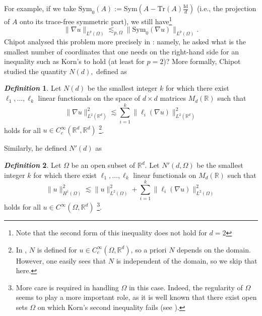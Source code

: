 \documentclass[11pt, a4paper, reqno]{elsarticle}
\theoremstyle{definition}
\newtheorem{definition}{\textsl{Definition}}
\theoremstyle{remark}
\begin{document}
For example, if we take 
$\mathrm{Sym}_0(A):=
\mathrm{Sym}\left(A-\mathrm{Tr}(A)\frac{\mathrm{Id}}d\right)$
(i.e., the projection of $A$ onto its trace-free symmetric 
part), we still have\footnote{Note that the second form
of this inequality does not hold for $d=2$}
\begin{equation*}
    \|\nabla u\|_{L^p(\Omega)}
\lesssim_{p,\Omega}
    \|\mathrm{Sym}_0(\nabla u)\|_{L^p(\Omega)}.
\end{equation*}
Chipot analysed this problem 
more precisely in \cite{Chipot2021OnType}: 
namely, he asked what is the smallest 
number of coordinates
that one needs on the right-hand side for an inequality
such as Korn's to hold (at least for $p=2$)?
More formally, Chipot studied the quantity $N(d),$ defined as
\begin{definition}
    Let $N(d)$ be the smallest integer $k$ for which
    there exist $\ell_1,\dots, \ell_k$ linear functionals on the space of $d\times d$ matrices $M_d(\mathbb{R})$
    such that
    \begin{equation}
    \label{eq : Ndef}
        \|\nabla u\|_{L^2(\mathbb{R}^d)}^2
    \lesssim
        \sum_{i=1}^k \|\ell_i(\nabla u)\|_{L^2(\mathbb{R}^d)}^2
    \end{equation}
    holds for all  $u\in C^\infty_c(\mathbb R^d,\mathbb{R}^d)$
    \footnote{In \cite{Chipot2021OnType}, $N$ is defined 
    for $u\in C^\infty_c(\Omega, \mathbb{R}^d)$, so a priori 
    $N$ depends on the domain. 
    However, one easily sees that $N$
    is independent of the domain, so we skip that here.}.
\end{definition}
Similarly, he defined $N'(d)$ as
\begin{definition}
    Let $\Omega$ be an open subset of $\mathbb{R}^d$. Let $N'(d, \Omega)$ be the smallest integer $k$ for which
    there exist $\ell_1,\dots, \ell_k$ linear functionals on $M_d(\mathbb{R})$
    such that
    \begin{equation}
    \label{eq : N1def}
        \| u\|_{H^1(\Omega)}^2
    \lesssim
        \|u\|_{L^2(\Omega)}^2
    +
        \sum_{i=1}^k \|\ell_i(\nabla u)\|_{L^2(\Omega)}^2
    \end{equation}
    holds for all $u\in C^\infty(\Omega,\mathbb{R}^d)$
    \footnote
    {
        More care is required
        in handling $\Omega$ in this case. Indeed, the 
        regularity of $\Omega$ seems to play a more 
        important role, as it is well known
        that there exist open sets 
        $\Omega$ on which Korn's second
        inequality fails
        (see \cite{JohnKorn}).
    }.
\end{definition}
\end{document}
